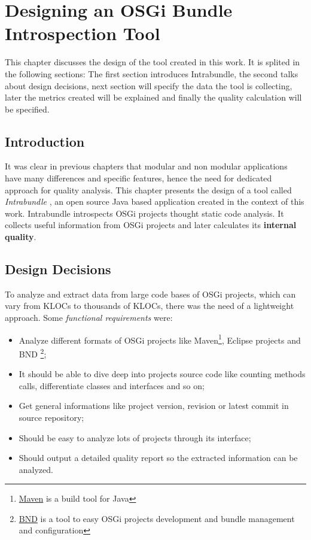 \chapter{Designing an OSGi Bundle Introspection Tool}
This chapter discusses the design of the tool created in this work. It is splited in the following sections: The first section introduces Intrabundle, the second talks about design decisions, next section will specify the data the tool is collecting, later the metrics created will be explained and finally the quality calculation will be specified.


\section{Introduction}
\label{ch03:intro}
It was clear in previous chapters that modular and non modular applications have many differences and specific features, hence the need for dedicated approach for quality analysis. This chapter presents the design of a tool called \emph{Intrabundle} \citep{intrabundle github 2014}, an open source Java based application created in the context of this work. Intrabundle introspects OSGi projects thought static code analysis. It collects useful information from OSGi projects and later calculates its \textbf{internal quality}.  


\section{Design Decisions}
\label{ch03:decisions}
To analyze and extract data from large code bases of OSGi projects, which can vary from KLOCs to thousands of KLOCs, there was the need of a lightweight approach. Some \emph{functional requirements} were:

\begin{itemize}
\item Analyze different formats of OSGi projects like Maven\footnote{\href{http://maven.apache.org/index.html}{Maven} is a build tool for Java}, Eclipse projects and BND \footnote{\href{http://bndtools.org/}{BND} is a tool to easy OSGi projects development and bundle management and configuration}; 
\item It should be able to dive deep into projects source code like counting methods calls, differentiate classes and interfaces and so on;  
\item Get general informations like project version, revision or latest commit in source repository;
\item Should be easy to analyze lots of projects through its interface;
\item Should output a detailed quality report so the extracted information can be analyzed.
\end{itemize}

